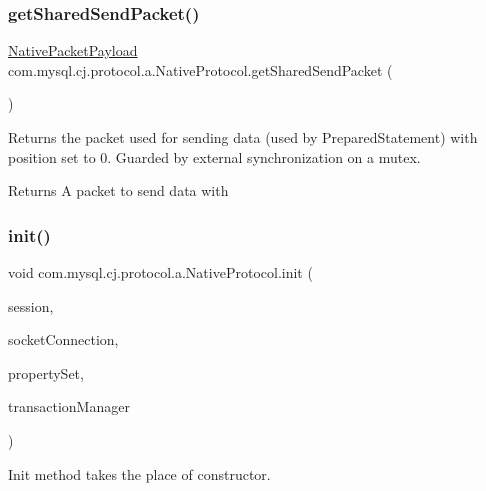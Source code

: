 \subsubsection{\texorpdfstring{get\+Shared\+Send\+Packet()}{getSharedSendPacket()}}
{\footnotesize\ttfamily \mbox{\hyperlink{classcom_1_1mysql_1_1cj_1_1protocol_1_1a_1_1_native_packet_payload}{Native\+Packet\+Payload}} com.\+mysql.\+cj.\+protocol.\+a.\+Native\+Protocol.\+get\+Shared\+Send\+Packet (\begin{DoxyParamCaption}{ }\end{DoxyParamCaption})}

Returns the packet used for sending data (used by Prepared\+Statement) with position set to 0. Guarded by external synchronization on a mutex.

\begin{DoxyReturn}{Returns}
A packet to send data with 
\end{DoxyReturn}
\mbox{\label{classcom_1_1mysql_1_1cj_1_1protocol_1_1a_1_1_native_protocol_a78d72401af5414a2271b9f1012b8a2f9}} 
\subsubsection{\texorpdfstring{init()}{init()}}
{\footnotesize\ttfamily void com.\+mysql.\+cj.\+protocol.\+a.\+Native\+Protocol.\+init (\begin{DoxyParamCaption}\item[{\mbox{\hyperlink{interfacecom_1_1mysql_1_1cj_1_1_session}{Session}}}]{session,  }\item[{\mbox{\hyperlink{interfacecom_1_1mysql_1_1cj_1_1protocol_1_1_socket_connection}{Socket\+Connection}}}]{socket\+Connection,  }\item[{\mbox{\hyperlink{interfacecom_1_1mysql_1_1cj_1_1conf_1_1_property_set}{Property\+Set}}}]{property\+Set,  }\item[{\mbox{\hyperlink{interfacecom_1_1mysql_1_1cj_1_1_transaction_event_handler}{Transaction\+Event\+Handler}}}]{transaction\+Manager }\end{DoxyParamCaption})}

Init method takes the place of constructor.

